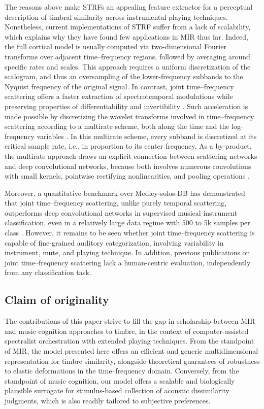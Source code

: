 \documentclass{bmcart}
\newcommand{\ja}[1]{\textcolor{purple}{JA: #1}\xspace}
\begin{document}
The reasons above make STRFs an appealing feature extractor for a perceptual description of timbral similarity across instrumental playing techniques.
Nonetheless, current implementations of STRF suffer from a lack of scalability, which explains why they have found few applications in MIR thus far.
Indeed, the full cortical model is usually computed via two-dimensional Fourier transforms over adjacent time--frequency regions, followed by averaging around specific rates and scales.
This approach requires a uniform discretization of the scalogram, and thus an oversampling of the lower-frequency subbands to the Nyquist frequency of the original signal.
In contrast, joint time--frequency scattering offers a faster extraction of spectrotemporal modulations while preserving properties of differentiability \cite{andreux2020jmlr} and invertibility \cite{lostanlen2019dafx}.
Such acceleration is made possible by discretizing the wavelet transforms involved in time--frequency scattering according to a multirate scheme, both along the time and the log-frequency variables \cite{anden2019tsp}.
In this multirate scheme, every subband is discretized at its critical sample rate, i.e., in proportion to its center frequency.
As a by-product, the multirate approach draws an explicit connection between scattering networks and deep convolutional networks, because both involves numerous convolutions with small kernels, pointwise rectifying nonlinearities, and pooling operations \cite{mallat2016philtrans}.

Moreover, a quantitative benchmark over Medley-solos-DB has demonstrated that joint time--frequency scattering, unlike purely temporal scattering, outperforms deep convolutional networks in supervised musical instrument classification, even in a relatively large data regime with 500 to 5k samples per class \cite{anden2019tsp}. %
However, it remains to be seen whether joint time--frequency scattering is capable of fine-grained auditory categorization, involving variability in instrument, mute, and playing technique.
In addition, previous publications on joint time--frequency scattering lack a human-centric evaluation, independently from any classification task.

\subsection*{Claim of originality}
The contributions of this paper strive to fill the gap in scholarship between MIR and music cognition approaches to timbre, in the context of computer-assisted spectralist orchestration with extended playing techniques.
From the standpoint of MIR, the model presented here offers an efficient and generic multidimensional representation for timbre similarity, alongside theoretical guarantees of robustness to elastic deformations in the time--frequency domain.
Conversely, from the standpoint of music cognition, our model offers a scalable and biologically plausible surrogate for stimulus-based collection of acoustic dissimilarity judgments, which is also readily tailored to subjective preferences.
\end{document}
